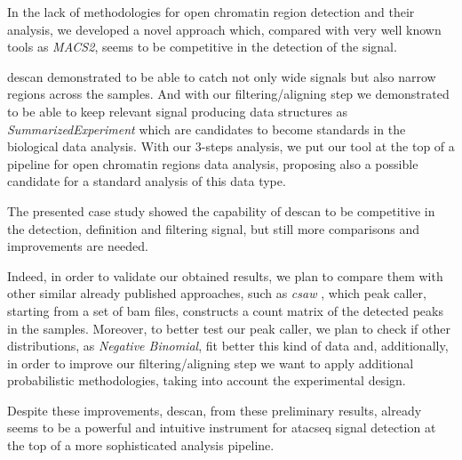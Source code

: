 In the lack of methodologies for open chromatin region detection and their analysis, we developed a novel approach which, compared with very well known tools as \textit{MACS2}, seems to be competitive in the detection of the signal.

\gls{descan} demonstrated to be able to catch not only wide signals but also narrow regions across the samples. 
And with our filtering/aligning step we demonstrated to be able to keep relevant signal producing data structures as \textit{SummarizedExperiment} which are candidates to become standards in the biological data analysis.
With our 3-steps analysis, we put our tool at the top of a pipeline for open chromatin regions data analysis, proposing also a possible candidate for a standard analysis of this data type.

The presented case study showed the capability of \gls{descan} to be competitive in the detection, definition and filtering signal, but still more comparisons and improvements are needed.

Indeed, in order to validate our obtained results, we plan to compare them with other similar already published approaches, such as \textit{csaw} \cite{Lun2015}, which peak caller, starting from a set of \gls{bam} files, constructs a count matrix of the detected peaks in the samples.
Moreover, to better test our peak caller, we plan to check if other distributions, as \textit{Negative Binomial}, fit better this kind of data and, additionally, in order to improve our filtering/aligning step we want to apply additional probabilistic methodologies, taking into account the experimental design.

Despite these improvements, \gls{descan}, from these preliminary results, already seems to be a powerful and intuitive instrument for \gls{atacseq} signal detection at the top of a more sophisticated analysis pipeline.

